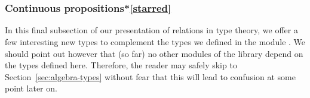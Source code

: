 \begin{code}%
\>[0][@{}l@{\AgdaIndent{0}}]%
\>[1]\AgdaSpace{}%
\AgdaSymbol{:}\AgdaSpace{}%
\>[402I]\AgdaSpace{}%
\AgdaSpace{}%
\AgdaSpace{}%
\AgdaSpace{}%
\AgdaSpace{}%
\AgdaSpace{}%
\AgdaSpace{}%
\AgdaSpace{}%
\AgdaSymbol{(}\AgdaSpace{}%
\AgdaSymbol{))}\AgdaSpace{}%
\AgdaSpace{}%
\AgdaSpace{}%
\AgdaSpace{}%
\AgdaSpace{}%
\<%
\\
\>[1][@{}l@{\AgdaIndent{0}}]%
\>[2]%
%
\>[25]\AgdaSpace{}%
\AgdaSpace{}%
\AgdaSpace{}%
\AgdaSpace{}%
\AgdaFunction{,}\AgdaSpace{}%
\AgdaSpace{}%
\AgdaSpace{}%
\AgdaSpace{}%
\AgdaSpace{}%
\AgdaFunction{,}\AgdaSpace{}%
\AgdaSymbol{(}\AgdaSpace{}%
\AgdaSpace{}%
\AgdaSpace{}%
\AgdaSpace{}%
\AgdaSpace{}%
\AgdaSpace{}%
\AgdaSpace{}%
\AgdaSpace{}%
\AgdaSpace{}%
\AgdaSpace{}%
\AgdaSpace{}%
\AgdaSpace{}%
\AgdaSymbol{)}\<%
\\
%
\>[1]\AgdaSpace{}%
\AgdaSpace{}%
\AgdaSpace{}%
\AgdaSpace{}%
\AgdaSpace{}%
\AgdaSpace{}%
\AgdaSpace{}%
\AgdaSymbol{=}\AgdaSpace{}%
\AgdaSpace{}%
\AgdaSpace{}%
\AgdaSpace{}%
\AgdaSpace{}%
\<%
\end{code}







\subsubsection{Continuous propositions*\protect\cref{starred}}\label{sec:cont-prop-types}
In this final subsection of our presentation of relations in type theory, we offer a few interesting new types to complement the types we defined in the module .  We should point out however that (so far) no other modules of the library depend on the types defined here. Therefore, the reader may safely skip to Section~\ref{sec:algebra-types} without fear that this will lead to confusion at some point later on.

